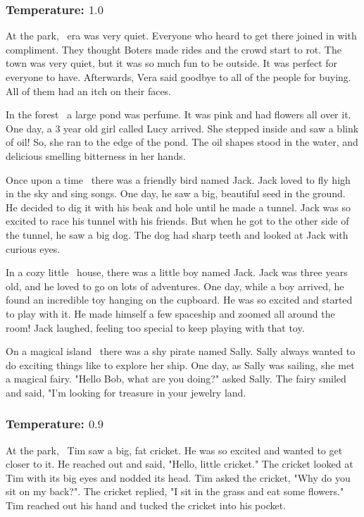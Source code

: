 \documentclass[11pt]{article}
\begin{document}
    \subsubsection*{Temperature: $1.0$}

    At the park, \textellipsis\ era was very quiet. Everyone who heard to get there joined in with compliment. They thought Boters made rides and the crowd start to rot. The town was very quiet, but it was so much fun to be outside. It was perfect for everyone to have. Afterwards, Vera said goodbye to all of the people for buying. All of them had an itch on their faces.

    In the forest \textellipsis\ a large pond was perfume. It was pink and had flowers all over it. One day, a 3 year old girl called Lucy arrived. She stepped inside and saw a blink of oil! So, she ran to the edge of the pond. The oil shapes stood in the water, and delicious smelling bitterness in her hands.

    Once upon a time \textellipsis\ there was a friendly bird named Jack. Jack loved to fly high in the sky and sing songs. One day, he saw a big, beautiful seed in the ground. He decided to dig it with his beak and hole until he made a tunnel. Jack was so excited to race his tunnel with his friends. But when he got to the other side of the tunnel, he saw a big dog. The dog had sharp teeth and looked at Jack with curious eyes.

    In a cozy little \textellipsis\ house, there was a little boy named Jack. Jack was three years old, and he loved to go on lots of adventures. One day, while a boy arrived, he found an incredible toy hanging on the cupboard. He was so excited and started to play with it. He made himself a few spaceship and zoomed all around the room! Jack laughed, feeling too special to keep playing with that toy.

    On a magical island \textellipsis\ there was a shy pirate named Sally. Sally always wanted to do exciting things like to explore her ship. One day, as Sally was sailing, she met a magical fairy. "Hello Bob, what are you doing?" asked Sally. The fairy smiled and said, "I'm looking for treasure in your jewelry land.

    \subsubsection*{Temperature: $0.9$}

    At the park, \textellipsis\ Tim saw a big, fat cricket. He was so excited and wanted to get closer to it. He reached out and said, "Hello, little cricket."  The cricket looked at Tim with its big eyes and nodded its head. Tim asked the cricket, "Why do you sit on my back?".  The cricket replied, "I sit in the grass and eat some flowers."  Tim reached out his hand and tucked the cricket into his pocket.
\end{document}
